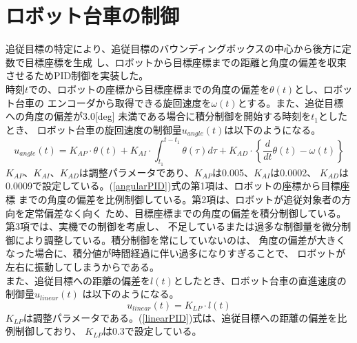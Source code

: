 \section{ロボット台車の制御}
追従目標の特定により、追従目標のバウンディングボックスの中心から後方に定数で目標座標を生成
し、ロボットから目標座標までの距離と角度の偏差を収束させるためPID制御を実装した。 \\ \indent
時刻$t$での、ロボットの座標から目標座標までの角度の偏差を$\theta(t)$とし、ロボット台車の
エンコーダから取得できる旋回速度を$\omega(t)$とする。また、追従目標への角度の偏差が3.0[deg]
未満である場合に積分制御を開始する時刻を$t_1$としたとき、
ロボット台車の旋回速度の制御量$u_{angle}(t)$は以下のようになる。
\begin{equation}
\label{angularPID}
u_{angle}(t) = K_{AP} \cdot \theta(t)+ K_{AI} \cdot \int_{t_1}^{t-t_1} \theta(\tau) d\tau + K_{AD} \cdot \left\{ \frac{d}{dt} \theta(t) - \omega(t) \right\}
\end{equation}
$K_{AP}$、$K_{AI}$、$K_{AD}$は調整パラメータであり、$K_{AP}$は0.005、$K_{AI}$は0.0002、
$K_{AD}$は0.0009で設定している。(\ref{angularPID})式の第1項は、ロボットの座標から目標座標
までの角度の偏差を比例制御している。第2項は、ロボットが追従対象者の方向を定常偏差なく向く
ため、目標座標までの角度の偏差を積分制御している。第3項では、実機での制御を考慮し、
不足しているまたは過多な制御量を微分制御により調整している。積分制御を常にしていないのは、
角度の偏差が大きくなった場合に、積分値が時間経過に伴い過多になりすぎることで、
ロボットが左右に振動してしまうからである。\\ \indent
また、追従目標への距離の偏差を$l(t)$としたとき、ロボット台車の直進速度の制御量$u_{linear}(t)$
は以下のようになる。
\begin{equation}
\label{linearPID}
u_{linear}(t) = K_{LP} \cdot l(t)
\end{equation}
$K_{LP}$は調整パラメータである。(\ref{linearPID})式は、追従目標への距離の偏差を比例制御しており、
$K_{LP}$は0.3で設定している。

